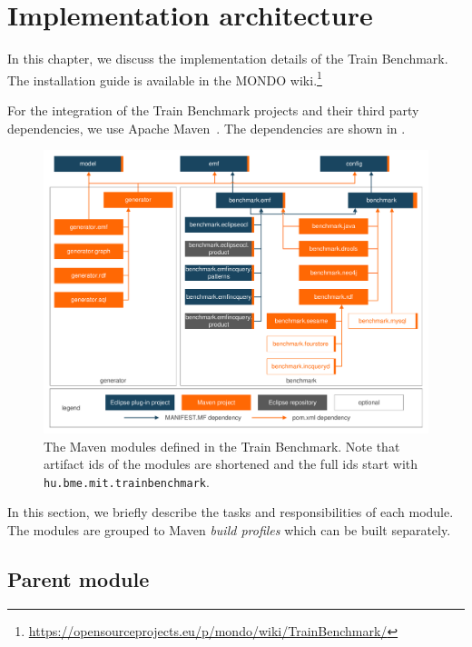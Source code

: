 \section{Implementation architecture}

In this chapter, we discuss the implementation details of the Train Benchmark. The installation guide is available in the MONDO wiki.\footnote{\url{https://opensourceprojects.eu/p/mondo/wiki/TrainBenchmark/}}


For the integration of the Train Benchmark projects and their third party dependencies, we use Apache Maven~\cite{Maven}. The dependencies are shown in .

\begin{figure}%
	\centering
	\includegraphics[width=\textwidth]{figures/trainbenchmark-modules}
	\caption{The Maven modules defined in the Train Benchmark. Note that artifact ids of the modules are shortened and the full ids start with \texttt{hu.bme.mit.trainbenchmark}.}
	\label{fig:trainbenchmark-modules}
\end{figure}

In this section, we briefly describe the tasks and responsibilities of each module. The modules are grouped to Maven \emph{build profiles} which can be built separately.

\subsection{Parent module}

